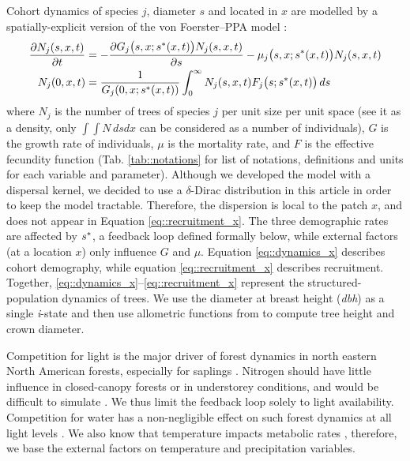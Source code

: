 Cohort dynamics of species $ j $, diameter $ s $ and located in $ x $ are modelled by a spatially-explicit version of the von Foerster--PPA model \citep{Strigul2008}:
\begin{align}
	\frac{\partial N_j(s, x, t)}{\partial t} &= - \frac{\partial G_j \big(s, x; {s}^{*}(x, t) \big) N_j(s, x, t)}{\partial s} - \mu_j\big(s, x; {s}^{*}(x, t) \big) N_j(s, x, t) \label{eq::dynamics_x} \\
	N_j(0, x, t) &= \frac{1}{G_j(0, x; {s}^{*}(x, t))} \int_0^{\infty} N_j(s, x, t) F_j\big(s; {s}^{*}(x, t) \big) \, ds \label{eq::recruitment_x}
\end{align}
where $ N_j $ is the number of trees of species $ j $ per unit size per unit space (see it as a density, only $ \int \int N \, ds dx $ can be considered as a number of individuals), $ G $ is the growth rate of individuals, $ \mu $ is the mortality rate, and $ F $ is the effective fecundity function (\cf Tab. \ref{tab::notations} for list of notations, definitions and units for each variable and parameter). Although we developed the model with a dispersal kernel, we decided to use a $ \delta $-Dirac distribution in this article in order to keep the model tractable. Therefore, the dispersion is local to the patch $ x $, and does not appear in Equation \eqref{eq::recruitment_x}. The three demographic rates are affected by $ {s}^{*} $, a feedback loop defined formally below, while external factors (at a location $ x $) only influence $ G $ and $ \mu $. Equation \eqref{eq::dynamics_x} describes cohort demography, while equation \eqref{eq::recruitment_x} describes recruitment. Together, \eqref{eq::dynamics_x}--\eqref{eq::recruitment_x} represent the structured-population dynamics of trees. We use the diameter at breast height (\textit{dbh}) as a single \textit{i}-state and then use allometric functions from \citet{Purves2007} to compute tree height and crown diameter.

Competition for light is the major driver of forest dynamics in north eastern North American forests, especially for saplings \citep{Pacala1996, Purves2007}. Nitrogen should have little influence in closed-canopy forests or in understorey conditions, and would be difficult to simulate \citep{Kobe2006}. We thus limit the feedback loop solely to light availability. Competition for water has a non-negligible effect on such forest dynamics at all light levels \citep{Kobe2006}. We also know that temperature impacts metabolic rates \citep{Brown2004}, therefore, we base the external factors on temperature and precipitation variables.

